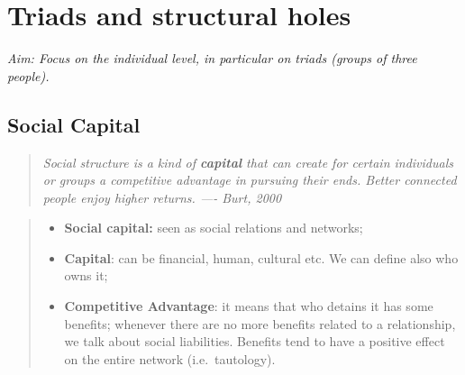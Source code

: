 \documentclass[
  notitlepage,
  onecolumn,
  openany]{book}
\providecommand{\tightlist}{%
  \setlength{\itemsep}{0pt}\setlength{\parskip}{0pt}}
\begin{document}
\hypertarget{triads-and-structural-holes}{%
\chapter{Triads and structural holes}\label{triads-and-structural-holes}}

\emph{Aim: Focus on the individual level, in particular on triads (groups of three people).}

\hypertarget{social-capital}{%
\section{Social Capital}\label{social-capital}}

\begin{quote}
\emph{Social structure is a kind of \textbf{capital} that can create for certain individuals or groups a competitive advantage in pursuing their ends. Better connected people enjoy higher returns.
---- Burt, 2000}
\end{quote}

\begin{quote}
\begin{itemize}
\tightlist
\item
  \textbf{Social capital:} seen as social relations and networks;
\item
  \textbf{Capital}: can be financial, human, cultural etc. We can define also who owns it;
\item
  \textbf{Competitive Advantage}: it means that who detains it has some benefits; whenever there are no more benefits related to a relationship, we talk about social liabilities. Benefits tend to have a positive effect on the entire network (i.e.~tautology).
\end{itemize}
\end{quote}
\end{document}
